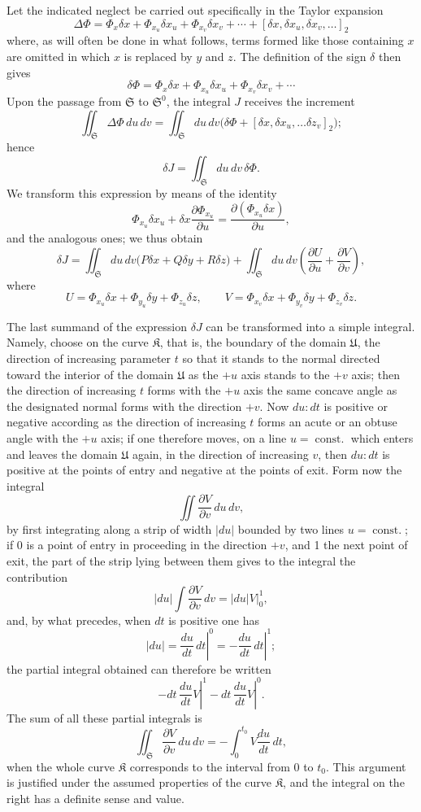 \documentclass[11pt,a4paper,leqno]{article}
\begin{document}
Let the indicated neglect be carried out specifically in the
Taylor expansion
\[
\Delta\Phi=\Phi_x\delta x+\Phi_{x_u}\delta x_u+\Phi_{x_v}\delta x_v
+\cdots+[\delta x,\delta x_u,\delta x_v,\ldots]_2
\]
where, as will often be done in what follows, terms formed like those
containing $x$ are omitted in which $x$ is replaced by $y$ and $z$.
The definition of the sign $\delta$ then gives
\[
\delta\Phi=\Phi_x\delta x+\Phi_{x_u}\delta x_u+\Phi_{x_v}\delta x_v+\cdots
\]
Upon the passage from $\mathfrak{S}$ to $\mathfrak{S}^0$, the integral $J$ receives the increment
\[
\iint_{\mathfrak{S}}\Delta\Phi\,du\,dv
=\iint_{\mathfrak{S}}du\,dv
\bigl(\delta\Phi+[\delta x,\delta x_u,\ldots\delta z_v]_2\bigr);
\]
hence
\[
\delta J=\iint_{\mathfrak{S}}du\,dv\,\delta\Phi.
\]
We transform this expression by means of the identity
\[
\Phi_{x_u}\delta x_u
+\delta x\frac{\partial\Phi_{x_u}}{\partial u}
=\frac{\partial(\Phi_{x_u}\delta x)}{\partial u},
\]
and the analogous ones; we thus obtain
\[
\delta J=\iint_{\mathfrak{S}}du\,dv
\bigl(P\delta x+Q\delta y+R\delta z\bigr)
+\iint_{\mathfrak{S}}du\,dv
\left(\frac{\partial U}{\partial u}+\frac{\partial V}{\partial v}\right),
\]
where
\[
U=\Phi_{x_u}\delta x+\Phi_{y_u}\delta y+\Phi_{z_u}\delta z,
\qquad
V=\Phi_{x_v}\delta x+\Phi_{y_v}\delta y+\Phi_{z_v}\delta z.
\]

The last summand of the expression $\delta J$ can be transformed into a
simple integral. Namely, choose on the curve $\mathfrak{K}$, that is, the
boundary of the domain $\mathfrak{U}$, the direction of increasing parameter $t$
so that it stands to the normal directed toward the interior of the
domain $\mathfrak{U}$ as the $+u$ axis stands to the $+v$ axis; then the direction
of increasing $t$ forms with the $+u$ axis the same concave angle as the
designated normal forms with the direction $+v$. Now $du:dt$ is positive
or negative according as the direction of increasing $t$ forms an acute
or an obtuse angle with the $+u$ axis; if one therefore moves, on a line
$u=\operatorname{const.}$ which enters and leaves the domain $\mathfrak{U}$ again, in the direction
of increasing $v$, then $du:dt$ is positive at the points of entry and
negative at the points of exit. Form now the integral
\[
\iint\frac{\partial V}{\partial v}\,du\,dv,
\]
by first integrating along a strip of width $|du|$ bounded by two
lines $u=\operatorname{const.}$; if 0 is a point of entry in proceeding in the
direction $+v$, and 1 the next point of exit, the part of the strip
lying between them gives to the integral the contribution
\[
|du|\int\frac{\partial V}{\partial v}\,dv
=|du|\left.V\right|_0^1,
\]
and, by what precedes, when $dt$ is positive one has
\[
|du|=\left.\frac{du}{dt}\,dt\right|^0
=-\left.\frac{du}{dt}\,dt\right|^1;
\]
the partial integral obtained can therefore be written
\[
-\left.dt\,\frac{du}{dt}V\right|^1
-\left.dt\,\frac{du}{dt}V\right|^0.
\]
The sum of all these partial integrals is
\[
\iint_{\mathfrak{S}}\frac{\partial V}{\partial v}\,du\,dv
=-\int_0^{t_0}V\frac{du}{dt}\,dt,
\]
when the whole curve $\mathfrak{K}$ corresponds to the interval from 0 to $t_0$.
This argument is justified under the assumed properties of the curve
$\mathfrak{K}$, and the integral on the right has a definite sense and value.
\end{document}
